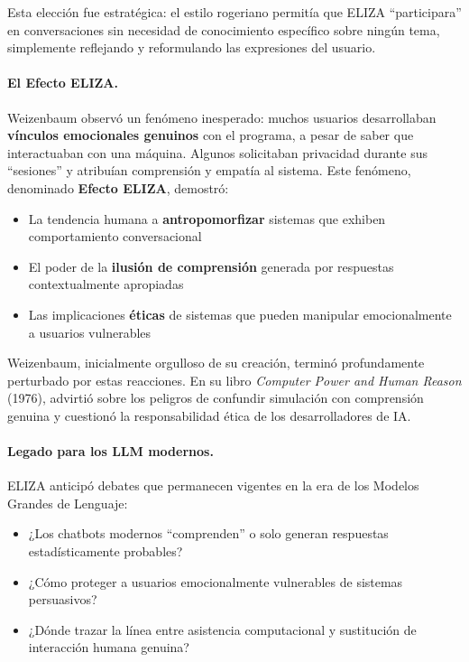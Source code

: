 \documentclass[12pt,a4paper]{report}
\numberwithin{figure}{section}
\begin{document}
Esta elección fue estratégica: el estilo rogeriano permitía que ELIZA ``participara'' en conversaciones sin necesidad de conocimiento específico sobre ningún tema, simplemente reflejando y reformulando las expresiones del usuario.

\paragraph{El Efecto ELIZA.}
Weizenbaum observó un fenómeno inesperado: muchos usuarios desarrollaban \textbf{vínculos emocionales genuinos} con el programa, a pesar de saber que interactuaban con una máquina. Algunos solicitaban privacidad durante sus ``sesiones'' y atribuían comprensión y empatía al sistema. Este fenómeno, denominado \textbf{Efecto ELIZA}, demostró:
\begin{itemize}
    \item La tendencia humana a \textbf{antropomorfizar} sistemas que exhiben comportamiento conversacional
    \item El poder de la \textbf{ilusión de comprensión} generada por respuestas contextualmente apropiadas
    \item Las implicaciones \textbf{éticas} de sistemas que pueden manipular emocionalmente a usuarios vulnerables
\end{itemize}

Weizenbaum, inicialmente orgulloso de su creación, terminó profundamente perturbado por estas reacciones. En su libro \textit{Computer Power and Human Reason} (1976), advirtió sobre los peligros de confundir simulación con comprensión genuina y cuestionó la responsabilidad ética de los desarrolladores de IA.

\paragraph{Legado para los LLM modernos.}
ELIZA anticipó debates que permanecen vigentes en la era de los Modelos Grandes de Lenguaje:
\begin{itemize}
    \item ¿Los chatbots modernos ``comprenden'' o solo generan respuestas estadísticamente probables?
    \item ¿Cómo proteger a usuarios emocionalmente vulnerables de sistemas persuasivos?
    \item ¿Dónde trazar la línea entre asistencia computacional y sustitución de interacción humana genuina?
\end{itemize}
\end{document}
